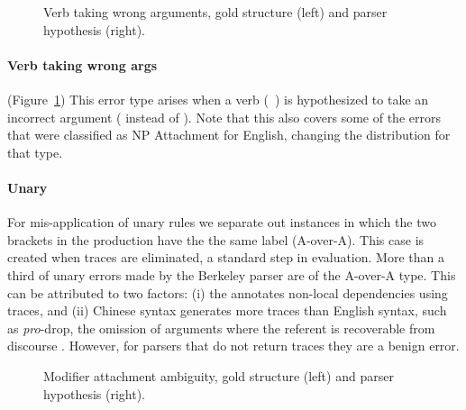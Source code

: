 \begin{figure}
\centering
  \caption[Error analysis example: Verb taking wrong arguments (Chinese).]{ \label{fig:wrong_arg}
    Verb taking wrong arguments, gold structure (left) and parser hypothesis (right).
  }
\end{figure}

\paragraph{Verb taking wrong args} (Figure~\ref{fig:wrong_arg})
This error type
arises when a verb \mbox{(\myeg~)} is hypothesized to take
an incorrect argument (\mbox{} instead of
\mbox{}).  Note that this also covers some of the errors
that were classified as NP Attachment for English, changing
the distribution for that type.

\paragraph{Unary}
For mis-application of unary rules we separate out instances in which the two brackets in the production have the the same label (A-over-A).
This case is created when traces are eliminated, a standard step in evaluation.
More than a third of unary errors made by the Berkeley parser are of the A-over-A type.
This can be attributed to two factors: (i) the \pctb annotates non-local dependencies using traces, and (ii) Chinese syntax generates more traces than English syntax, such as \emph{pro}-drop, the omission of arguments where the referent is recoverable from discourse \parencite{Guo-Wang-VanGenabith:2007:EMNLP}.
However, for parsers that do not return traces they are a benign error.

\begin{figure}
\centering
  \caption[Error analysis example: modifier attachment (Chinese).]{ \label{fig:mod_att}
    Modifier attachment ambiguity, gold structure (left) and parser hypothesis (right).
  }
\end{figure}

